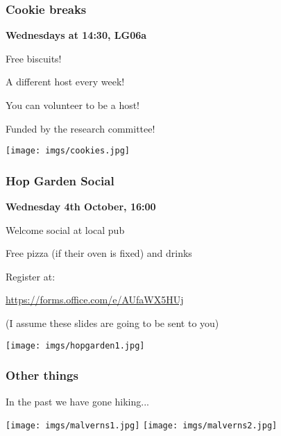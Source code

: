 \begin{frame}
    \frametitle{Cookie breaks}
    \centering

    \textbf{\LARGE Wednesdays at 14:30, LG06a}

    \vspace{1em}

    \begin{minipage}{0.45\textwidth}
        \alert{Free biscuits}!

        \vspace{0.5em}

        A different host every week!

        \vspace{0.5em}

        You can \alert{volunteer} to be a host!

        \vspace{0.5em}

        Funded by the research committee!
    \end{minipage}
    \begin{minipage}{0.4\textwidth}
        \texttt{[image: imgs/cookies.jpg]}
    \end{minipage}
\end{frame}

\begin{frame}
    \frametitle{Hop Garden Social}
    \centering

    \textbf{\LARGE Wednesday 4th October, 16:00}

    \vspace{1em}

    \begin{minipage}{0.45\textwidth}

        Welcome social at local pub

        Free \alert{pizza}
        {\scriptsize(if their oven is fixed)}
        and \alert{drinks}

        \vspace{1em}

        Register at:

        \url{https://forms.office.com/e/AUfaWX5HUj}

        \vspace{1em}

        \scriptsize
        (I assume these slides are going to be sent to you)

    \end{minipage}
    \begin{minipage}{0.4\textwidth}
        \texttt{[image: imgs/hopgarden1.jpg]}
    \end{minipage}

\end{frame}
\begin{frame}
    \frametitle{Other things}
    \centering

    \Large
    In the past we have gone hiking...

    \vspace{1em}

    \texttt{[image: imgs/malverns1.jpg]}
    \texttt{[image: imgs/malverns2.jpg]}


\end{frame}
